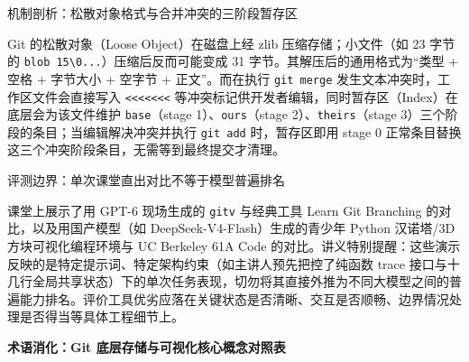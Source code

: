 \documentclass[UTF8,a4paper,11pt,fontset=fandol]{ctexart}
\begin{document}
\begin{knowledgebox}{机制剖析：松散对象格式与合并冲突的三阶段暂存区}

Git 的松散对象（Loose Object）在磁盘上经 zlib 压缩存储；小文件（如 23 字节的 \texttt{blob 15\textbackslash{}0...}）压缩后反而可能变成 31 字节。其解压后的通用格式为“类型 + 空格 + 字节大小 + 空字节 + 正文”。而在执行 \texttt{git merge} 发生文本冲突时，工作区文件会直接写入 \texttt{<<<<<<<} 等冲突标记供开发者编辑，同时暂存区（Index）在底层会为该文件维护 \texttt{base}（stage 1）、\texttt{ours}（stage 2）、\texttt{theirs}（stage 3）三个阶段的条目；当编辑解决冲突并执行 \texttt{git add} 时，暂存区即用 stage 0 正常条目替换这三个冲突阶段条目，无需等到最终提交才清理。

\end{knowledgebox}

\begin{warningbox}{评测边界：单次课堂直出对比不等于模型普遍排名}

课堂上展示了用 GPT-6 现场生成的 \texttt{gitv} 与经典工具 Learn Git Branching 的对比，以及用国产模型（如 DeepSeek-V4-Flash）生成的青少年 Python 汉诺塔/3D 方块可视化编程环境与 UC Berkeley 61A Code 的对比。讲义特别提醒：这些演示反映的是特定提示词、特定架构约束（如主讲人预先把控了纯函数 trace 接口与十几行全局共享状态）下的单次任务表现，切勿将其直接外推为不同大模型之间的普遍能力排名。评价工具优劣应落在关键状态是否清晰、交互是否顺畅、边界情况处理是否得当等具体工程细节上。

\end{warningbox}

\par{}\textbf{术语消化：Git 底层存储与可视化核心概念对照表}
\end{document}
